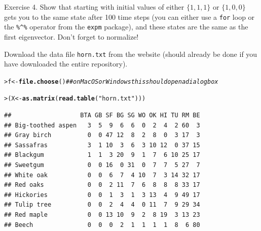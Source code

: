 \documentclass[11pt]{article}\usepackage[]{graphicx}\usepackage[]{color}
\makeatletter
\newcommand{\hlstr}[1]{\textcolor[rgb]{0.192,0.494,0.8}{#1}}%
\newcommand{\hlcom}[1]{\textcolor[rgb]{0.678,0.584,0.686}{\textit{#1}}}%
\newcommand{\hlstd}[1]{\textcolor[rgb]{0.345,0.345,0.345}{#1}}%
\newcommand{\hlkwb}[1]{\textcolor[rgb]{0.69,0.353,0.396}{#1}}%
\newcommand{\hlkwd}[1]{\textcolor[rgb]{0.737,0.353,0.396}{\textbf{#1}}}%
\newenvironment{kframe}{%
 \def\at@end@of@kframe{}%
 \ifinner\ifhmode%
  \def\at@end@of@kframe{\end{minipage}}%
  \begin{minipage}{\columnwidth}%
 \fi\fi%
 \def\FrameCommand##1{\hskip\@totalleftmargin \hskip-\fboxsep
 \colorbox{shadecolor}{##1}\hskip-\fboxsep
     \hskip-\linewidth \hskip-\@totalleftmargin \hskip\columnwidth}%
 \MakeFramed {\advance\hsize-\width
   \@totalleftmargin\z@ \linewidth\hsize
   \@setminipage}}%
 {\par\unskip\endMakeFramed%
 \at@end@of@kframe}
\newenvironment{knitrout}{}{} %
\newcommand{\code}[1]{{\tt #1}}
\numberwithin{exercise}{section}
\makeatother
\begin{document}



Exercise 4. Show that starting with initial values of either
$\{1,1,1\}$ or $\{1,0,0\}$ gets you to the same state after 100 time
steps (you can either use a \code{for} loop or the \verb+%^%+ operator
from the \code{expm} package), and these states are the same as the
first eigenvector.  Don't forget to normalize!








Download the data file \code{horn.txt} from the website (should
already be done if you have downloaded the entire repository).
\begin{knitrout}
\color{fgcolor}\begin{kframe}
\begin{alltt}
\hlstd{> }\hlstd{f} \hlkwb{<-} \hlkwd{file.choose}\hlstd{()}  \hlcom{## on MacOS or Windows this should open a dialog box}
\end{alltt}
\end{kframe}
\end{knitrout}

\begin{knitrout}
\color{fgcolor}\begin{kframe}
\begin{alltt}
\hlstd{> }\hlstd{(X} \hlkwb{<-} \hlkwd{as.matrix}\hlstd{(}\hlkwd{read.table}\hlstd{(}\hlstr{"horn.txt"}\hlstd{)))}
\end{alltt}
\begin{verbatim}
##                   BTA GB SF BG SG WO OK HI TU RM BE
## Big-toothed aspen   3  5  9  6  6  0  2  4  2 60  3
## Gray birch          0  0 47 12  8  2  8  0  3 17  3
## Sassafras           3  1 10  3  6  3 10 12  0 37 15
## Blackgum            1  1  3 20  9  1  7  6 10 25 17
## Sweetgum            0  0 16  0 31  0  7  7  5 27  7
## White oak           0  0  6  7  4 10  7  3 14 32 17
## Red oaks            0  0  2 11  7  6  8  8  8 33 17
## Hickories           0  0  1  3  1  3 13  4  9 49 17
## Tulip tree          0  0  2  4  4  0 11  7  9 29 34
## Red maple           0  0 13 10  9  2  8 19  3 13 23
## Beech               0  0  0  2  1  1  1  1  8  6 80
\end{verbatim}
\end{kframe}
\end{knitrout}
\end{document}
